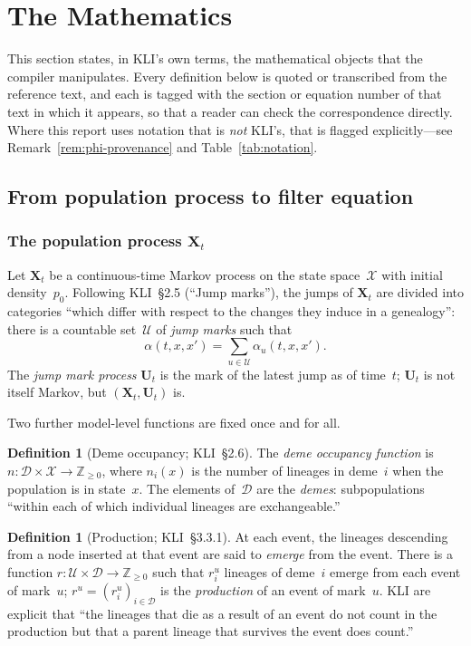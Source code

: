 \documentclass[11pt,leqno]{article}
\newcommand{\Xr}{\mathbf{X}}        %
\newcommand{\Ur}{\mathbf{U}}        %
\newcommand{\Xspace}{\mathcal{X}}   %
\newcommand{\Jumps}{\mathcal{U}}    %
\newcommand{\Demes}{\mathcal{D}}    %
\newcommand{\Zp}{\mathbb{Z}_{\ge 0}}
\theoremstyle{plain}
\theoremstyle{definition}
\newtheorem{definition}[theorem]{Definition}
\begin{document}
\section{The Mathematics}
\label{sec:math}

This section states, in KLI's own terms, the mathematical objects that the
compiler manipulates.  Every definition below is quoted or transcribed from
the reference text, and each is tagged with the section or equation number of
that text in which it appears, so that a reader can check the correspondence
directly.  Where this report uses notation that is \emph{not} KLI's, that is
flagged explicitly---see Remark~\ref{rem:phi-provenance} and
Table~\ref{tab:notation}.

\subsection{From population process to filter equation}

\subsubsection{The population process $\Xr_t$}

Let $\Xr_t$ be a continuous-time Markov process on the state
space~$\Xspace$ with initial density~$p_0$.  Following KLI~\S2.5
(``Jump marks''), the jumps of $\Xr_t$ are divided into categories
``which differ with respect to the changes they induce in a
genealogy'': there is a countable set~$\Jumps$ of \emph{jump marks}
such that
\[
  \alpha(t,x,x') = \sum_{u \in \Jumps} \alpha_u(t,x,x').
\]
The \emph{jump mark process} $\Ur_t$ is the mark of the latest jump as
of time~$t$; $\Ur_t$ is not itself Markov, but $(\Xr_t, \Ur_t)$ is.

Two further model-level functions are fixed once and for all.

\begin{definition}[Deme occupancy; KLI~\S2.6]
The \emph{deme occupancy function} is
$n : \Demes \times \Xspace \to \Zp$, where $n_i(x)$ is the number of
lineages in deme~$i$ when the population is in state~$x$.  The
elements of~$\Demes$ are the \emph{demes}: subpopulations
``within each of which individual lineages are exchangeable.''
\end{definition}

\begin{definition}[Production; KLI~\S3.3.1]
At each event, the lineages descending from a node inserted at that
event are said to \emph{emerge} from the event.  There is a function
$r : \Jumps \times \Demes \to \Zp$ such that $r^u_i$ lineages of
deme~$i$ emerge from each event of mark~$u$; $r^u = (r^u_i)_{i \in
\Demes}$ is the \emph{production} of an event of mark~$u$.  KLI are
explicit that ``the lineages that die as a result of an event do not
count in the production but that a parent lineage that survives the
event does count.''
\end{definition}
\end{document}

